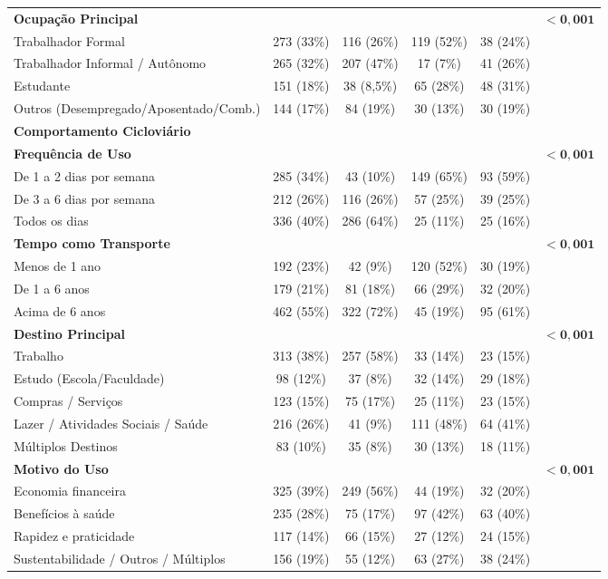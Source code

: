 \documentclass[12pt]{article}
\begin{document}
\begin{table}[htbp]
{\begin{tabular}{@{}lccccc@{}}
\textbf{Ocupação Principal} & & & & & $\mathbf{< 0,001}$ \\
\quad Trabalhador Formal & 273 (33\%) & 116 (26\%) & 119 (52\%) & 38 (24\%) & \\
\quad Trabalhador Informal / Autônomo & 265 (32\%) & 207 (47\%) & 17 (7\%) & 41 (26\%) & \\
\quad Estudante & 151 (18\%) & 38 (8,5\%) & 65 (28\%) & 48 (31\%) & \\
\quad Outros (Desempregado/Aposentado/Comb.) & 144 (17\%) & 84 (19\%) & 30 (13\%) & 30 (19\%) & \\

\midrule
\textbf{Comportamento Cicloviário} & & & & & \\
\midrule

\textbf{Frequência de Uso} & & & & & $\mathbf{< 0,001}$ \\
\quad De 1 a 2 dias por semana & 285 (34\%) & 43 (10\%) & 149 (65\%) & 93 (59\%) & \\
\quad De 3 a 6 dias por semana & 212 (26\%) & 116 (26\%) & 57 (25\%) & 39 (25\%) & \\
\quad Todos os dias & 336 (40\%) & 286 (64\%) & 25 (11\%) & 25 (16\%) & \\

\textbf{Tempo como Transporte} & & & & & $\mathbf{< 0,001}$ \\
\quad Menos de 1 ano & 192 (23\%) & 42 (9\%) & 120 (52\%) & 30 (19\%) & \\
\quad De 1 a 6 anos & 179 (21\%) & 81 (18\%) & 66 (29\%) & 32 (20\%) & \\
\quad Acima de 6 anos & 462 (55\%) & 322 (72\%) & 45 (19\%) & 95 (61\%) & \\

\textbf{Destino Principal} & & & & & $\mathbf{< 0,001}$ \\
\quad Trabalho & 313 (38\%) & 257 (58\%) & 33 (14\%) & 23 (15\%) & \\
\quad Estudo (Escola/Faculdade) & 98 (12\%) & 37 (8\%) & 32 (14\%) & 29 (18\%) & \\
\quad Compras / Serviços & 123 (15\%) & 75 (17\%) & 25 (11\%) & 23 (15\%) & \\
\quad Lazer / Atividades Sociais / Saúde & 216 (26\%) & 41 (9\%) & 111 (48\%) & 64 (41\%) & \\
\quad Múltiplos Destinos & 83 (10\%) & 35 (8\%) & 30 (13\%) & 18 (11\%) & \\

\textbf{Motivo do Uso} & & & & & $\mathbf{< 0,001}$ \\
\quad Economia financeira & 325 (39\%) & 249 (56\%) & 44 (19\%) & 32 (20\%) & \\
\quad Benefícios à saúde & 235 (28\%) & 75 (17\%) & 97 (42\%) & 63 (40\%) & \\
\quad Rapidez e praticidade & 117 (14\%) & 66 (15\%) & 27 (12\%) & 24 (15\%) & \\
\quad Sustentabilidade / Outros / Múltiplos & 156 (19\%) & 55 (12\%) & 63 (27\%) & 38 (24\%) & \\


\end{tabular}}
\end{table}
\end{document}

